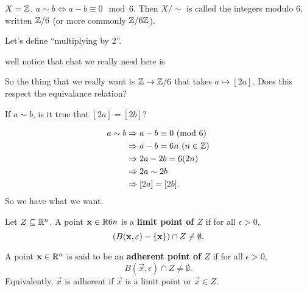 \documentclass[12pt, twosided]{article}
\begin{document}
\begin{exa}
  \(X = \mathbb{Z}\), \(a \sim b \Leftrightarrow a-b \equiv 0 \mod{6}\). Then \(X/\sim\) is called the integers modulo 6, written \(\mathbb{Z}/6\) (or more commonly \(\mathbb{Z}/6\mathbb{Z}\)).

  Let's define ``multiplying by 2''.

  \begin{center}
  \end{center}

  well notice that ehat we really need here is
  \begin{center}
  \end{center}

  So the thing that we really want is \(\mathbb{Z} \to \mathbb{Z}/6\) that takes \(a \mapsto [2a]\). Does this respect the equivalance relation?

  If \(a \sim b\), is it true that \([2a] = [2b]\)?

  \begin{align*}
    a \sim b &\Rightarrow a-b \equiv 0 \ (\mathrm{mod}\ 6) \\
             &\Rightarrow a - b = 6n\ (n \in \mathbb{Z}) \\
             &\Rightarrow 2a -2b = 6(2n) \\
             &\Rightarrow 2a \sim 2b \\
             &\Rightarrow [2a] = [2b].
  \end{align*}
  So we have what we want.
  
\end{exa}


\begin{df}
  Let \(Z \subseteq \mathbb{R}^n\). A point \(\mathbf{x} \in \mathbb{R}6n\) is a \textbf{limit point of \(Z\)} if for all \(\epsilon > 0\), \[(B(\mathbf{x}, \varepsilon) - \left\{ \mathbf{x} \right\}) \cap Z \neq \emptyset.\]

  A point \(\mathbf{x} \in \mathbb{R}^n\) is said to be an \textbf{adherent point of \(Z\)} if for all \(\epsilon > 0\), \[B(\vec{x}, \epsilon) \cap Z \neq \emptyset.\] Equivalently, \(\vec{x}\) is adherent if \(\vec{x}\) is a limit point or \(\vec{x} \in Z\).
\end{df}
\end{document}
